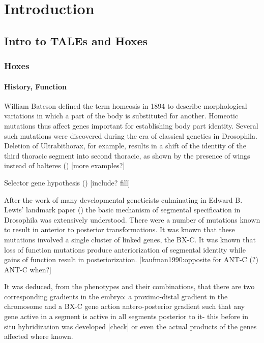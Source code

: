 \chapter{Introduction}


\label{chp:intro}

\section{Intro to TALEs and Hoxes}

\subsection{Hoxes}

\subsubsection{History, Function}

William Bateson defined the term homeosis in 1894 to describe morphological variations in which a part of the body is substituted for another. Homeotic mutations thus affect genes important for establishing body part identity. Several such mutations were discovered during the era of classical genetics in Drosophila. Deletion of Ultrabithorax, for example, results in a shift of the identity of the third thoracic segment into second thoracic, as shown by the presence of wings instead of halteres (\cite{ref}) [more examples?]

Selector gene hypothesis (\cite{Garcia-Bellido1975,Garcia-Bellido1977}) [include? fill]

After the work of many developmental geneticists culminating in Edward B. Lewis' landmark paper (\cite{Lewis1978}) the basic mechanism of segmental specification in Drosophila was extensively understood. There were a number of mutations known to result in anterior to posterior transformations. It was known that these mutations involved a single cluster of linked genes, the \ac{BX-C}. It was known that loss of function mutations produce anteriorization of segmental identity while gains of function result in posteriorization. [kaufman1990:opposite for \ac{ANT-C} (?) \ac{ANT-C} when?]

It was deduced, from the phenotypes and their combinations, that there are two corresponding gradients in the embryo: a proximo-distal gradient in the chromosome and a \ac{BX-C} gene action antero-posterior gradient such that any gene active in a segment is active in all segments posterior to it- this before in situ hybridization was developed [check] or even the actual products of the genes affected where known.

